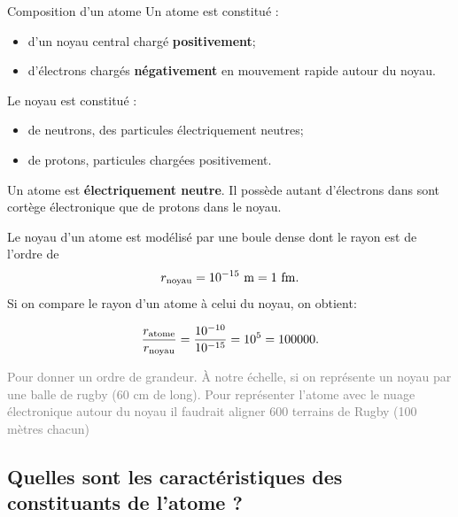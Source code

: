 \documentclass[french]{article}
\begin{document}
\begin{definition}{Composition d'un atome}
	Un atome est constitué : 
	\begin{itemize}
		
		\item d'un noyau central chargé \textbf{positivement};
		\item d'électrons chargés \textbf{négativement} en mouvement rapide autour du noyau.
	\end{itemize}

	Le noyau est constitué : 

	\begin{itemize}
		\item de neutrons, des particules électriquement neutres;

		
		\item de protons, particules chargées positivement. 
	\end{itemize}
 \medskip
	
	Un atome est \textbf{électriquement neutre}. Il possède autant d'électrons dans sont cortège électronique que de protons dans le noyau.
\end{definition}

Le noyau d'un atome est modélisé par une boule dense dont le rayon est de l'ordre de $$r_{\rm noyau} = 10^{-15}~\rm m = 1~\rm fm.$$ Si on compare le rayon d'un atome à celui du noyau, on obtient: 

\begin{equation}
	\dfrac{r_{\rm atome}}{r_{\rm noyau}} = \dfrac{10^{-10}}{10^{-15}} = 10^5 = 100 000.
\end{equation}

\noindent\textcolor{gray}{Pour donner un ordre de grandeur. À notre échelle, si on représente un noyau par une balle de rugby (60 cm de long). Pour représenter l'atome avec le nuage électronique autour du noyau il faudrait aligner 600 terrains de Rugby (100 mètres chacun)}

\subsection{Quelles sont les caractéristiques des constituants de l'atome ?}
\end{document}
